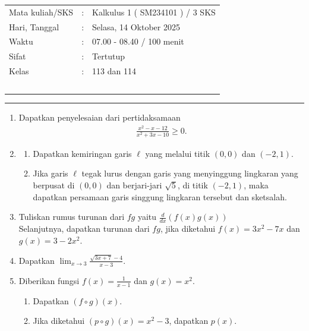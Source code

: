\documentclass[10pt,openany,a4paper]{article}
\theoremstyle{definition}
\theoremstyle{definition}
\theoremstyle{plain}
\begin{document}
    \begin{center}
	\begin{tabular}{lcl}
		Mata kuliah/SKS & : & Kalkulus 1 ( SM234101 ) / 3 SKS\\
		Hari, Tanggal & : & Selasa, 14 Oktober 2025\\
		Waktu & : & 07.00 - 08.40 / 100 menit\\
		Sifat & : & Tertutup\\
		Kelas & : & 113 dan 114\\
  ~
	\end{tabular}
    
    \noindent\rule{\textwidth}{2.pt}
        \end{center}
        \begin{enumerate}
            \item Dapatkan penyelesaian dari pertidaksamaan 
            \begin{align*}
                \frac{x^2-x-12}{x^2+3x-10}\geq 0.
            \end{align*}
            \item \begin{enumerate}
                \item Dapatkan kemiringan garis $\ell$ yang melalui titik $(0,0)$ dan $(-2,1)$.
                \item Jika garis $\ell$ tegak lurus dengan garis yang menyinggung lingkaran yang berpusat di $(0,0)$ dan berjari-jari $\sqrt{5}$, di titik $(-2,1)$, maka dapatkan persamaan garis singgung lingkaran tersebut dan sketsalah.
            \end{enumerate}
            \item Tuliskan rumus turunan dari $fg$ yaitu $\frac{d}{dx}(f(x)g(x))$\\
            Selanjutnya, dapatkan turunan dari $fg$, jika diketahui $f(x)=3x^2-7x$ dan $g(x)=3-2x^2$.
            \item Dapatkan $\displaystyle \lim_{x\to 3} \frac{\sqrt{3x+7}-4}{x-3}$.
            \item Diberikan fungsi $f(x)=\frac{1}{x-1}$ dan $g(x)=x^2$.
            \begin{enumerate}
                \item Dapatkan $(f\circ g)(x)$.
                \item Jika diketahui $(p\circ g)(x)=  x^2-3$, dapatkan $p(x)$.
            \end{enumerate}
        \end{enumerate}
\end{document}
